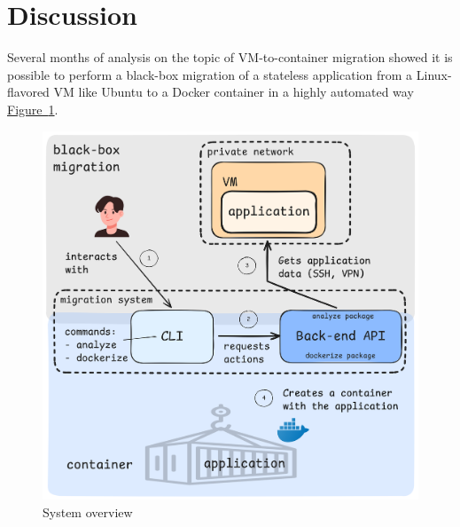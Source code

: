 \documentclass[twocolumn]{article}
\newcommand{\FigRef}[1]{\hyperref[#1]{Figure~\ref{#1}}}
\begin{document}
\section{Discussion}
Several months of analysis on the topic of VM-to-container migration showed it is possible to perform a black-box migration of a stateless application from a Linux-flavored VM like Ubuntu to a Docker container in a highly automated way \FigRef{fig:system-overview}. 

\begin{figure} [H]
    \centering
    \includegraphics[width=0.5\linewidth]{images/system-overview.png}
    \caption{System overview}
    \label{fig:system-overview}
\end{figure}
\end{document}
